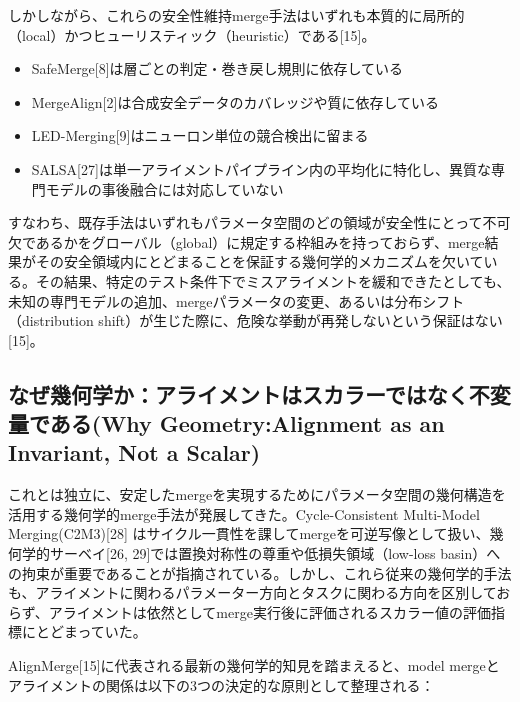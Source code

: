 \documentclass{article}
\begin{document}
しかしながら、これらの安全性維持merge手法はいずれも本質的に局所的（local）かつヒューリスティック（heuristic）である[15]。
\begin{itemize}
\item SafeMerge[8]は層ごとの判定・巻き戻し規則に依存している
\item MergeAlign[2]は合成安全データのカバレッジや質に依存している
\item LED-Merging[9]はニューロン単位の競合検出に留まる
\item SALSA[27]は単一アライメントパイプライン内の平均化に特化し、異質な専門モデルの事後融合には対応していない
\end{itemize}

すなわち、既存手法はいずれもパラメータ空間のどの領域が安全性にとって不可欠であるかをグローバル（global）に規定する枠組みを持っておらず、merge結果がその安全領域内にとどまることを保証する幾何学的メカニズムを欠いている。その結果、特定のテスト条件下でミスアライメントを緩和できたとしても、未知の専門モデルの追加、mergeパラメータの変更、あるいは分布シフト（distribution shift）が生じた際に、危険な挙動が再発しないという保証はない[15]。

\subsection{なぜ幾何学か：アライメントはスカラーではなく不変量である(Why Geometry:Alignment as an Invariant, Not a Scalar)}

これとは独立に、安定したmergeを実現するためにパラメータ空間の幾何構造を活用する幾何学的merge手法が発展してきた。Cycle-Consistent Multi-Model Merging(C2M3)[28] はサイクル一貫性を課してmergeを可逆写像として扱い、幾何学的サーベイ[26, 29]では置換対称性の尊重や低損失領域（low-loss basin）への拘束が重要であることが指摘されている。しかし、これら従来の幾何学的手法も、アライメントに関わるパラメーター方向とタスクに関わる方向を区別しておらず、アライメントは依然としてmerge実行後に評価されるスカラー値の評価指標にとどまっていた。

AlignMerge[15]に代表される最新の幾何学的知見を踏まえると、model mergeとアライメントの関係は以下の3つの決定的な原則として整理される：
\end{document}
